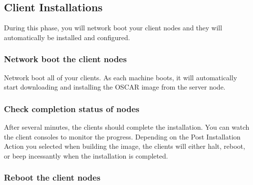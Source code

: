 \subsection{Client Installations}
\label{det:client-install}

During this phase, you will network boot your client nodes and they
will automatically be installed and configured.  


\subsubsection{Network boot the client nodes}


Network boot all of your clients.  As each machine boots, it will
automatically start downloading and installing the OSCAR image from
the server node.


\subsubsection{Check completion status of nodes}
\label{det:client-finish}

After several minutes, the clients should complete the installation.
You can watch the client consoles to monitor the progress. Depending
on the Post Installation Action you selected when building the image,
the clients will either halt, reboot, or beep incessantly when the
installation is completed.

  

\subsubsection{Reboot the client nodes}


